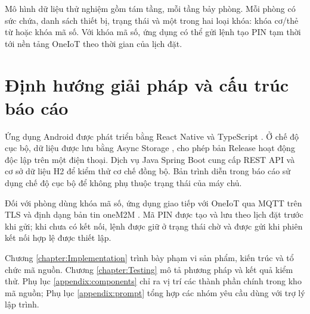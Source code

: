 Mô hình dữ liệu thử nghiệm gồm tám tầng, mỗi tầng bảy phòng. Mỗi phòng có sức chứa, danh sách thiết bị, trạng thái và một trong hai loại khóa: khóa cơ/thẻ từ hoặc khóa mã số. Với khóa mã số, ứng dụng có thể gửi lệnh tạo PIN tạm thời tới nền tảng OneIoT theo thời gian của lịch đặt.

\section{Định hướng giải pháp và cấu trúc báo cáo}

Ứng dụng Android được phát triển bằng React Native và TypeScript \cite{reactnative}. Ở chế độ cục bộ, dữ liệu được lưu bằng Async Storage \cite{asyncstorage}, cho phép bản Release hoạt động độc lập trên một điện thoại. Dịch vụ Java Spring Boot \cite{springboot} cung cấp REST API và cơ sở dữ liệu H2 để kiểm thử cơ chế đồng bộ. Bản trình diễn trong báo cáo sử dụng chế độ cục bộ để không phụ thuộc trạng thái của máy chủ.

Đối với phòng dùng khóa mã số, ứng dụng giao tiếp với OneIoT qua MQTT trên TLS \cite{mqtt} và định dạng bản tin oneM2M \cite{onem2m}. Mã PIN được tạo và lưu theo lịch đặt trước khi gửi; khi chưa có kết nối, lệnh được giữ ở trạng thái chờ và được gửi khi phiên kết nối hợp lệ được thiết lập.

Chương \ref{chapter:Implementation} trình bày phạm vi sản phẩm, kiến trúc và tổ chức mã nguồn. Chương \ref{chapter:Testing} mô tả phương pháp và kết quả kiểm thử. Phụ lục \ref{appendix:components} chỉ ra vị trí các thành phần chính trong kho mã nguồn; Phụ lục \ref{appendix:prompt} tổng hợp các nhóm yêu cầu dùng với trợ lý lập trình.
